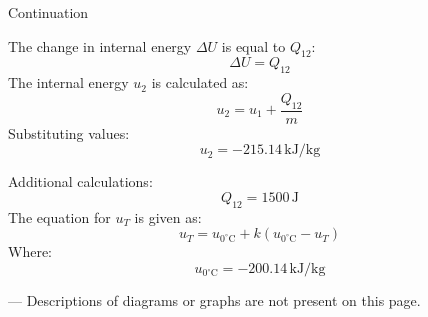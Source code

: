Continuation

The change in internal energy \( \Delta U \) is equal to \( Q_{12} \):  
\[
\Delta U = Q_{12}
\]  
The internal energy \( u_2 \) is calculated as:  
\[
u_2 = u_1 + \frac{Q_{12}}{m}
\]  
Substituting values:  
\[
u_2 = -215.14 \, \text{kJ/kg}
\]  

Additional calculations:  
\[
Q_{12} = 1500 \, \text{J}
\]  
The equation for \( u_{T} \) is given as:  
\[
u_{T} = u_{0^\circ \text{C}} + k (u_{0^\circ \text{C}} - u_{T})
\]  
Where:  
\[
u_{0^\circ \text{C}} = -200.14 \, \text{kJ/kg}
\]  

---  
Descriptions of diagrams or graphs are not present on this page.